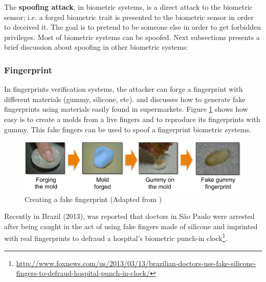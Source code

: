 
The \textbf{spoofing attack}, in biometric systems, is a direct attack to the biometric sensor; i.e. a forged biometric trait is presented to the biometric sensor in order to deceived it. The goal is to pretend to be someone else in order to get forbidden privileges. Most of biometric systems can be spoofed. Next subsections presents a brief discussion about spoofing in other biometric systems:

\subsubsection{Fingerprint}

In fingerprints verification systems, the attacker can forge a fingerprint with different materials (gummy, silicone, etc). \cite{matsumoto2002impact} and \cite{leyden2002gummi} discusses how to generate fake fingerprints using materials easily found in supermarkets. Figure \ref{fig:finger_attack} shows how easy is to create a molds from a live fingers and to reproduce its fingerprints with gummy. This fake fingers can be used  to spoof a fingerprint biometric systems.

\begin{figure}[!htb]
\begin{center}
\includegraphics [width=16cm] {images/finger_print_attack.pdf}
\caption[Creating a fake fingerprint]{Creating a fake fingerprint (Adapted from \cite{matsumoto2002impact})} \label{fig:finger_attack}
\end{center}
\end{figure}

Recently in Brazil (2013), was reported that doctors in S\~ao Paulo were arrested after being caught in the act of using fake fingers made of silicone and imprinted with real fingerprints to defraud a hospital's biometric punch-in clock\footnote{\url{http://www.foxnews.com/us/2013/03/13/brazilian-doctors-use-fake-silicone-fingers-to-defraud-hospital-punch-in-clock/}}.

